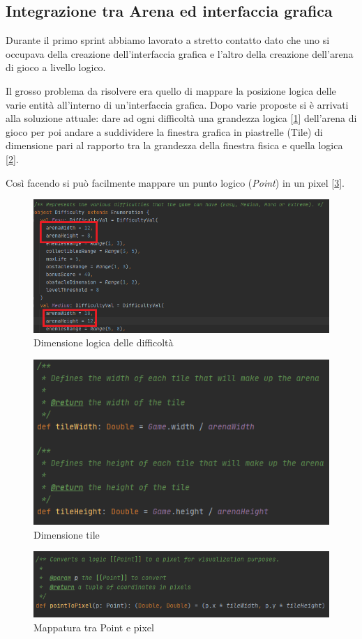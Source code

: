 \subsection{Integrazione tra Arena ed interfaccia grafica}
Durante il primo sprint abbiamo lavorato a stretto contatto dato che uno si occupava della creazione dell'interfaccia grafica e l'altro della creazione dell'arena di gioco a livello logico.

Il grosso problema da risolvere era quello di mappare la posizione logica delle varie entità all'interno di un'interfaccia grafica.
Dopo varie proposte si è arrivati alla soluzione attuale: dare ad ogni difficoltà una grandezza logica [\ref{difficulty}] dell'arena di gioco per poi andare a suddividere la finestra grafica in piastrelle (Tile) di dimensione pari al rapporto tra la grandezza della finestra fisica e quella logica [\ref{tile}].

Così facendo si può facilmente mappare un punto logico (\textit{Point}) in un pixel [\ref{conversion}].

\begin{figure}[H]
    \centering
      \includegraphics[width=13cm]{res/6-implementazione/chianapasini/difficulty.png}
      \caption{Dimensione logica delle difficoltà}
      \label{difficulty}
    \end{figure}
    
\begin{figure}[H]
    \centering
      \includegraphics[width=13cm]{res/6-implementazione/chianapasini/tile.png}
      \caption{Dimensione tile}
      \label{tile}
    \end{figure}
    
\begin{figure}[H]
    \centering
      \includegraphics[width=13cm]{res/6-implementazione/chianapasini/conversion.png}
      \caption{Mappatura tra Point e pixel}
      \label{conversion}
    \end{figure}